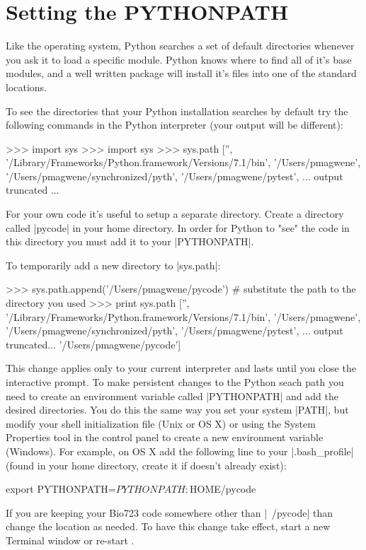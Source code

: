 \section{Setting the PYTHONPATH}

Like the operating system, Python searches a set of default directories whenever you ask it to load a specific module.  Python knows where to find all of it's base modules, and a well written package will install it's files into one of the standard locations.

To see the directories that your Python installation searches by default try the following commands in the Python interpreter (your output will be different):
%
\begin{python}
>>> import sys
>>> import sys
>>> sys.path
['', '/Library/Frameworks/Python.framework/Versions/7.1/bin', '/Users/pmagwene', 
'/Users/pmagwene/synchronized/pyth', '/Users/pmagwene/pytest', 
... output truncated ...
\end{python}

For your own code it's useful to setup a separate directory. Create a directory called |pycode| in your home directory. In order for Python to "see" the code in this directory you must add it to your |PYTHONPATH|.

To temporarily add a new directory to |sys.path|:
\begin{python}
>>> sys.path.append('/Users/pmagwene/pycode') # substitute the path to the directory you used
>>> print sys.path
['', '/Library/Frameworks/Python.framework/Versions/7.1/bin', '/Users/pmagwene', 
'/Users/pmagwene/synchronized/pyth', '/Users/pmagwene/pytest', 
... output truncated...
'/Users/pmagwene/pycode']
\end{python}

This change applies only to your current interpreter and lasts until you close the interactive prompt. To make persistent changes to the Python seach path you need to create an environment variable called |PYTHONPATH| and add the desired directories.  You do this the same way you set your system |PATH|, but modify your shell initialization file (Unix or OS X) or using the System Properties tool in the control panel to create a new environment variable (Windows). For example, on OS X add the following line to your |.bash_profile| (found in your home directory, create it if doesn't already exist):
%
\begin{bash}
export PYTHONPATH=$PYTHONPATH:$HOME/pycode   
\end{bash}
%
If you are keeping your Bio723 code somewhere other than |~/pycode| than change the location as needed. To have this change take effect, start a new Terminal window or re-start \ipy.

